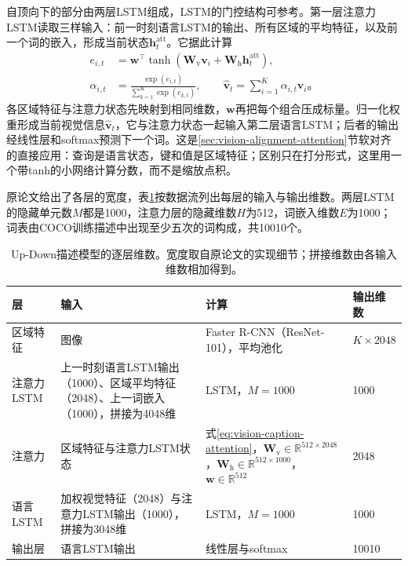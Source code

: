 自顶向下的部分由两层LSTM组成，LSTM的门控结构可参考。第一层注意力LSTM读取三样输入：前一时刻语言LSTM的输出、所有区域的平均特征，以及前一个词的嵌入，形成当前状态$\bm h_t^{\mathrm{att}}$。它据此计算
\begin{equation}
  \begin{aligned}
    e_{i,t}&=\bm w^\top\tanh(\bm W_{\mathrm v}\bm v_i
                             +\bm W_{\mathrm h}\bm h_t^{\mathrm{att}}),\\
    \alpha_{i,t}&=\frac{\exp(e_{i,t})}{\sum_{k=1}^{K}\exp(e_{k,t})},
    \qquad
    \hat{\bm v}_t=\sum_{i=1}^{K}\alpha_{i,t}\bm v_i\text{。}
  \end{aligned}
  \label{eq:vision-caption-attention}
\end{equation}
各区域特征与注意力状态先映射到相同维数，$\bm w$再把每个组合压成标量。归一化权重形成当前视觉信息$\hat{\bm v}_t$，它与注意力状态一起输入第二层语言LSTM；后者的输出经线性层和softmax预测下一个词。这是\ref{sec:vision-alignment-attention}节软对齐的直接应用：查询是语言状态，键和值是区域特征；区别只在打分形式，这里用一个带tanh的小网络计算分数，而不是缩放点积。

原论文给出了各层的宽度，表\ref{tab:vision-understanding-updown-config}按数据流列出每层的输入与输出维数。两层LSTM的隐藏单元数$M$都是1000，注意力层的隐藏维数$H$为512，词嵌入维数$E$为1000；词表由COCO训练描述中出现至少五次的词构成，共10010个。

\begin{table}[htbp]
  \centering
  \small
  \begin{tabularx}{\linewidth}{@{}p{18mm}XXp{14mm}@{}}
    \toprule
    层 & 输入 & 计算 & 输出维数\\
    \midrule
    区域特征 & 图像 & Faster R-CNN（ResNet-101），平均池化 & $K\times2048$\\
    注意力LSTM & 上一时刻语言LSTM输出（1000）、区域平均特征（2048）、上一词嵌入（1000），拼接为4048维 & LSTM，$M=1000$ & 1000\\
    注意力 & 区域特征与注意力LSTM状态 & 式\eqref{eq:vision-caption-attention}，$\bm W_{\mathrm v}\in\mathbb R^{512\times2048}$，$\bm W_{\mathrm h}\in\mathbb R^{512\times1000}$，$\bm w\in\mathbb R^{512}$ & 2048\\
    语言LSTM & 加权视觉特征（2048）与注意力LSTM输出（1000），拼接为3048维 & LSTM，$M=1000$ & 1000\\
    输出层 & 语言LSTM输出 & 线性层与softmax & 10010\\
    \bottomrule
  \end{tabularx}
  \caption{Up-Down描述模型的逐层维数。宽度取自原论文的实现细节；拼接维数由各输入维数相加得到。}
  \label{tab:vision-understanding-updown-config}
\end{table}

